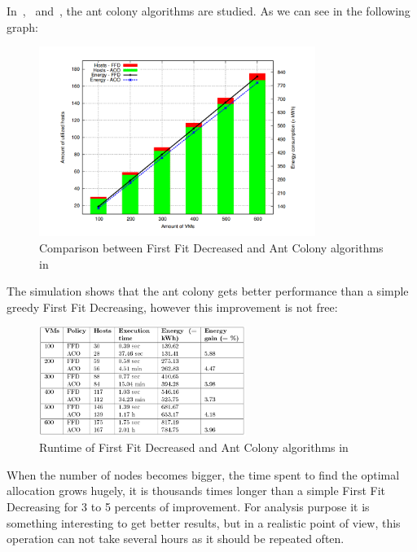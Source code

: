 \documentclass[a4paper,11pt]{article}
\begin{document}
In~\cite{algo:antcolony1},~\cite{algo:antcolony2} and~\cite{algo:antcolony3}, the ant colony
algorithms are studied. As we can see in the following graph:

\begin{figure}[H]
\begin{center}
	\includegraphics[width=0.8\textwidth]{./images/antcolonyperf.png}
	\caption{Comparison between First Fit Decreased and Ant Colony algorithms in~\cite{algo:antcolony2}}
\end{center}
\end{figure}

The simulation shows that the ant colony gets better performance than a simple greedy First
Fit Decreasing, however this improvement is not free:

\begin{figure}[H]
\begin{center}
	\includegraphics[width=0.6\textwidth]{./images/antcolonyruntime.png}
	\caption{Runtime of First Fit Decreased and Ant Colony algorithms in~\cite{algo:antcolony2}}
\end{center}
\end{figure}

When the number of nodes becomes bigger, the time spent to find the optimal
allocation grows hugely, it is thousands times longer than a simple First Fit
Decreasing for 3 to 5 percents of improvement. For analysis purpose it is
something interesting to get better results, but in a realistic point of view,
this operation can not take several hours as it should be repeated often.
\end{document}
